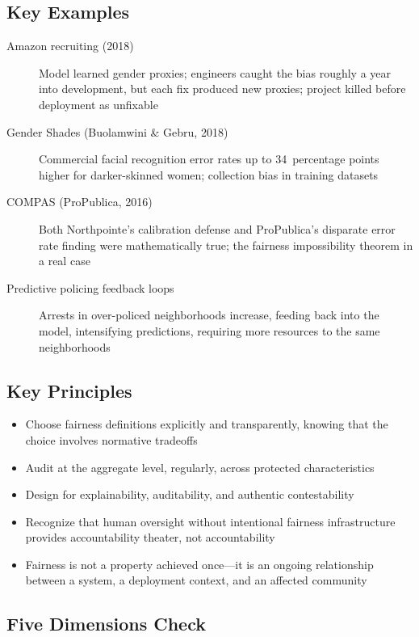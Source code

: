 \subsection*{Key Examples}

\begin{description}
  \item[Amazon recruiting \ai (2018)] Model learned gender proxies; engineers caught the bias roughly a year into development, but each fix produced new proxies; project killed before deployment as unfixable
  \item[Gender Shades (Buolamwini \& Gebru, 2018)] Commercial facial recognition error rates up to 34~percentage points higher for darker-skinned women; collection bias in training datasets
  \item[COMPAS (ProPublica, 2016)] Both Northpointe's calibration defense and ProPublica's disparate error rate finding were mathematically true; the fairness impossibility theorem in a real case
  \item[Predictive policing feedback loops] Arrests in over-policed neighborhoods increase, feeding back into the model, intensifying predictions, requiring more resources to the same neighborhoods
\end{description}

\subsection*{Key Principles}

\begin{itemize}
  \item Choose fairness definitions explicitly and transparently, knowing that the choice involves normative tradeoffs
  \item Audit at the aggregate level, regularly, across protected characteristics
  \item Design for explainability, auditability, and authentic contestability
  \item Recognize that human oversight without intentional fairness infrastructure provides accountability theater, not accountability
  \item Fairness is not a property achieved once---it is an ongoing relationship between a system, a deployment context, and an affected community
\end{itemize}

\subsection*{Five Dimensions Check}

